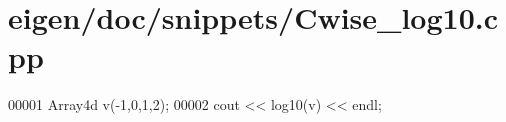 \hypertarget{eigen_2doc_2snippets_2_cwise__log10_8cpp_source}{}\section{eigen/doc/snippets/\+Cwise\+\_\+log10.cpp}
\label{eigen_2doc_2snippets_2_cwise__log10_8cpp_source}

\begin{DoxyCode}
00001 Array4d v(-1,0,1,2);
00002 cout << log10(v) << endl;
\end{DoxyCode}
